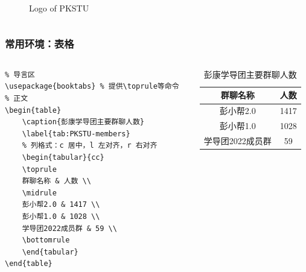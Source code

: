 \begin{frame}[fragile]
\begin{columns}
\begin{column}{0.4\textwidth}
\begin{figure}
                \caption{Logo of PKSTU}
                \label{fig:PKSTU-Logo}
            \end{figure}
        \end{column}
    \end{columns}
\end{frame}

\begin{frame}[fragile]
    \frametitle{常用环境：表格}
    \begin{columns}
        \begin{column}{0.6\textwidth}
            \scriptsize
            \begin{lstlisting}
% 导言区
\usepackage{booktabs} % 提供\toprule等命令
% 正文
\begin{table}
    \caption{彭康学导团主要群聊人数}
    \label{tab:PKSTU-members}
    % 列格式：c 居中，l 左对齐，r 右对齐
    \begin{tabular}{cc}
    \toprule
    群聊名称 & 人数 \\
    \midrule
    彭小帮2.0 & 1417 \\
    彭小帮1.0 & 1028 \\
    学导团2022成员群 & 59 \\
    \bottomrule
    \end{tabular}
\end{table}
            \end{lstlisting}
        \end{column}
        \begin{column}{0.5\textwidth}
            \begin{table}
                \small
                \caption{彭康学导团主要群聊人数}
                \label{tab:PKSTU-members}
                \begin{tabular}{cc}
                    \toprule
                    群聊名称 & 人数 \\
                    \midrule
                    彭小帮2.0 & 1417 \\
                    彭小帮1.0 & 1028 \\
                    学导团2022成员群 & 59 \\
                    \bottomrule
                \end{tabular}
            \end{table}
        \end{column}
    \end{columns}
\end{frame}